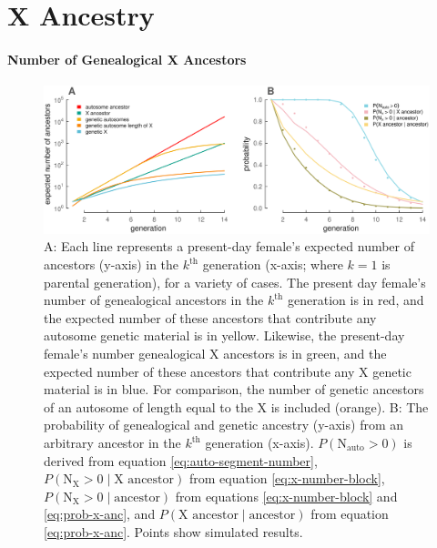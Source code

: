 \documentclass[9pt,twocolumn,twoside]{gsajnl}
\begin{document}
\section*{X Ancestry}
\label{sec:x-ancestry}

\paragraph{Number of Genealogical X Ancestors}

  \begin{figure}[!ht]
    \centering
    \includegraphics[width=\textwidth]{images/num-ancestors}

    \caption{A: Each line represents a present-day female's expected number of
      ancestors (y-axis) in the $k^\text{th}$ generation (x-axis; where $k=1$
      is parental generation), for a variety of cases. The present day female's
      number of genealogical ancestors in the $k^\text{th}$ generation is in
      red, and the expected number of these ancestors that contribute any
      autosome genetic material is in yellow. Likewise, the present-day
      female's number genealogical X ancestors is in green, and the expected
      number of these ancestors that contribute any X genetic material is in
      blue. For comparison, the number of genetic ancestors of an autosome of
      length equal to the X is included (orange). B: The probability of
      genealogical and genetic ancestry (y-axis) from an arbitrary ancestor in
      the $k^\text{th}$ generation (x-axis). $P(\text{N}_\text{auto} > 0)$ is
      derived from equation \eqref{eq:auto-segment-number},
      $P(\text{N}_\text{X} > 0 \;|\; \text{X ancestor})$ from equation
      \eqref{eq:x-number-block}, $P(\text{N}_\text{X} > 0 \;|\;
      \text{ancestor})$ from equations \eqref{eq:x-number-block} and
    \eqref{eq:prob-x-anc}, and $P(\text{X ancestor} \;|\; \text{ancestor})$
  from equation \eqref{eq:prob-x-anc}. Points show simulated results.}

\label{fig:num-ancestors}
\end{figure}
\end{document}
